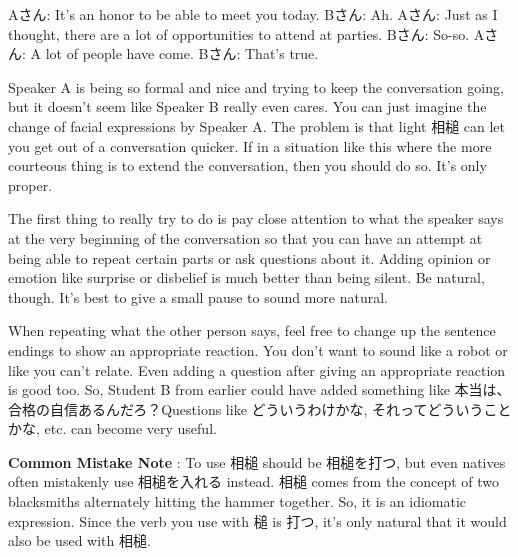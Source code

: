 \par{Aさん: It's an honor to be able to meet you today. \hfill\break
Bさん: Ah. \hfill\break
Aさん: Just as I thought, there are a lot of opportunities to attend at parties. \hfill\break
Bさん: So-so. \hfill\break
Aさん: A lot of people have come. \hfill\break
Bさん: That's true. }

\par{  Speaker A is being so formal and nice and trying to keep the conversation going, but it doesn't seem like Speaker B really even cares. You can just imagine the change of facial expressions by Speaker A. The problem is that light 相槌 can let you get out of a conversation quicker. If in a situation like this where the more courteous thing is to extend the conversation, then you should do so. It's only proper. }

\par{ The first thing to really try to do is pay close attention to what the speaker says at the very beginning of the conversation so that you can have an attempt at being able to repeat certain parts or ask questions about it. Adding opinion or emotion like surprise or disbelief is much better than being silent. Be natural, though. It's best to give a small pause to sound more natural. }

\par{ When repeating what the other person says, feel free to change up the sentence endings to show an appropriate reaction. You don't want to sound like a robot or like you can't relate. Even adding a question after giving an appropriate reaction is good too. So, Student B from earlier could have added something like 本当は、合格の自信あるんだろ？Questions like どういうわけかな, それってどういうことかな, etc. can become very useful. }

\par{\textbf{Common Mistake Note }: To use 相槌 should be 相槌を打つ, but even natives often mistakenly use 相槌を入れる instead. 相槌 comes from the concept of two blacksmiths alternately hitting the hammer together. So, it is an idiomatic expression. Since the verb you use with 槌 is 打つ, it's only natural that it would also be used with 相槌. }
    